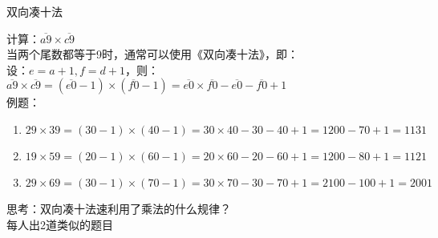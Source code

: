 \documentclass[aspectratio=169]{ctexbeamer} %
\begin{document}
\begin{frame}[t]{双向凑十法}
\begin{spacing}{1.2}
\normalsize
计算：$\overline{a9} \times \overline{c9}$ \\
当两个尾数都等于9时，通常可以使用《双向凑十法》，即：\\
设：$e = a+1, f = d+1$，则：\\
$\overline{a9} \times \overline{c9} = (\overline{e0}-1) \times (\overline{f0} - 1)  = \overline{e0} \times \overline{f0} - \overline{e0} - \overline{f0} + 1$ \\
例题：
\begin{enumerate}[label={\arabic*.}]
\item $29 \times 39 = (30-1) \times (40-1) = 30 \times 40 - 30 - 40 + 1=1200-70+1=1131$
\item $19 \times 59 = (20 -1) \times (60-1) = 20 \times 60 - 20 - 60 + 1=1200-80+1=1121$
\item $29 \times 69 = (30 -1) \times (70-1) = 30 \times 70 - 30 - 70 + 1=2100-100+1=2001$
\end{enumerate}
\alert{思考：双向凑十法速利用了乘法的什么规律？}\\
\alert{每人出2道类似的题目} 
\end{spacing}
\end{frame}
\end{document}
